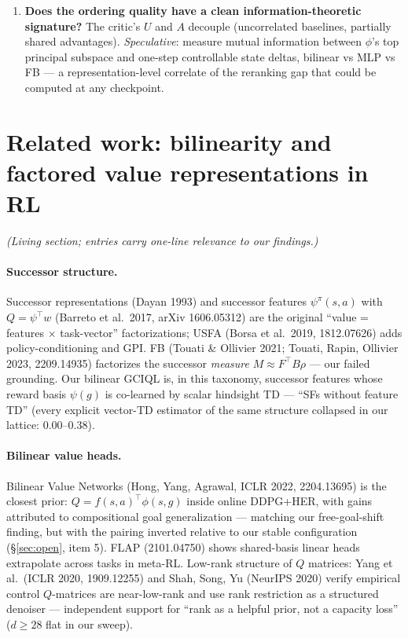 \documentclass[11pt]{article}
\begin{document}
\begin{enumerate}[leftmargin=1.6em,itemsep=3pt]
HER, DDPG) found the \emph{state-conditioned} pairing $f(s,a)^\top\phi(s,g)$ essential;
offline we find the opposite ($\psi(g)$ stable, $\psi(s,g)$ divergent). Is the difference
the offline expectile backup (no bound + no $V$-target + local inflation pockets), or the
data regime? \emph{Queued}: $\psi(s,g)$ with an output bound / $V$-target --- if it
stabilizes at bilinear level, the divergence, not the pairing, is the offline story.
\item \textbf{Does the ordering quality have a clean information-theoretic signature?}
The critic's $U$ and $A$ decouple (uncorrelated baselines, partially shared advantages).
\emph{Speculative}: measure mutual information between $\phi$'s top principal subspace and
one-step controllable state deltas, bilinear vs MLP vs FB --- a representation-level
correlate of the reranking gap that could be computed at any checkpoint.
\end{enumerate}

\section{Related work: bilinearity and factored value representations in RL}
\label{sec:related}

\emph{(Living section; entries carry one-line relevance to our findings.)}

\paragraph{Successor structure.} Successor representations (Dayan 1993) and successor
features $\psi^\pi(s,a)$ with $Q=\psi^\top w$ (Barreto et al.\ 2017, arXiv 1606.05312)
are the original ``value = features $\times$ task-vector'' factorizations; USFA (Borsa et
al.\ 2019, 1812.07626) adds policy-conditioning and GPI. FB (Touati \& Ollivier 2021;
Touati, Rapin, Ollivier 2023, 2209.14935) factorizes the successor \emph{measure}
$M\approx F^\top B\rho$ --- our failed grounding. Our bilinear GCIQL is, in this taxonomy,
successor features whose reward basis $\psi(g)$ is co-learned by scalar hindsight TD ---
``SFs without feature TD'' (every explicit vector-TD estimator of the same structure
collapsed in our lattice: 0.00--0.38).

\paragraph{Bilinear value heads.} Bilinear Value Networks (Hong, Yang, Agrawal, ICLR 2022,
2204.13695) is the closest prior: $Q=f(s,a)^\top\phi(s,g)$ inside online DDPG+HER, with
gains attributed to compositional goal generalization --- matching our free-goal-shift
finding, but with the pairing inverted relative to our stable configuration
(\S\ref{sec:open}, item 5). FLAP (2101.04750) shows shared-basis linear heads extrapolate
across tasks in meta-RL. Low-rank structure of $Q$ matrices: Yang et al.\ (ICLR 2020,
1909.12255) and Shah, Song, Yu (NeurIPS 2020) verify empirical control $Q$-matrices are
near-low-rank and use rank restriction as a structured denoiser --- independent support for
``rank as a helpful prior, not a capacity loss'' ($d\ge28$ flat in our sweep).
\end{document}
